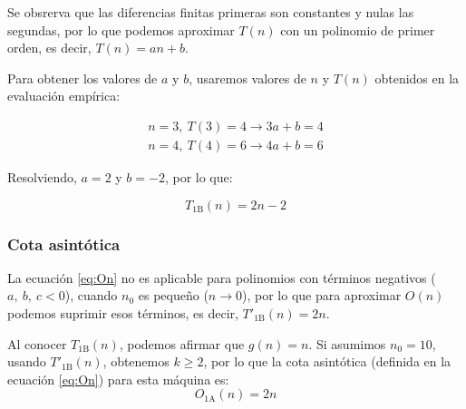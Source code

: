 Se obsrerva que las diferencias finitas primeras son constantes y nulas las segundas, por lo que podemos aproximar $T(n)$ con un polinomio de primer orden, es decir, $T(n) = an + b$.\medskip

Para obtener los valores de $a$ y $b$, usaremos valores de $n$ y $T(n)$ obtenidos en la evaluación empírica:

\begin{subequations}
    \begin{gather*}
        n = 3,\ T(3) = 4 \rightarrow 3a + b = 4 \\
        n = 4,\ T(4) = 6 \rightarrow 4a + b = 6
    \end{gather*}
\end{subequations}

Resolviendo, $a = 2$ y $b = -2$, por lo que:

\begin{equation}
    T_{\mathrm{1B}}(n) = 2n - 2
\end{equation}

\subsubsection*{Cota asintótica}
La ecuación \ref{eq:On} no es aplicable para polinomios con términos negativos ($a,\ b,\ c < 0$), cuando $n_0$ es pequeño ($n \rightarrow 0$), por lo que para aproximar $O(n)$ podemos suprimir esos términos, es decir, $T'_{\mathrm{1B}}(n) = 2n$.

Al conocer $T_{\mathrm{1B}}(n)$, podemos afirmar que $g(n) = n$. Si asumimos $n_0 = 10$, usando $T'_{\mathrm{1B}}(n)$, obtenemos $k \geq 2$, por lo que la cota asintótica (definida en la ecuación \ref{eq:On}) para esta máquina es:
\begin{equation}
    O_{\mathrm{1A}}(n) = 2n
\end{equation}

